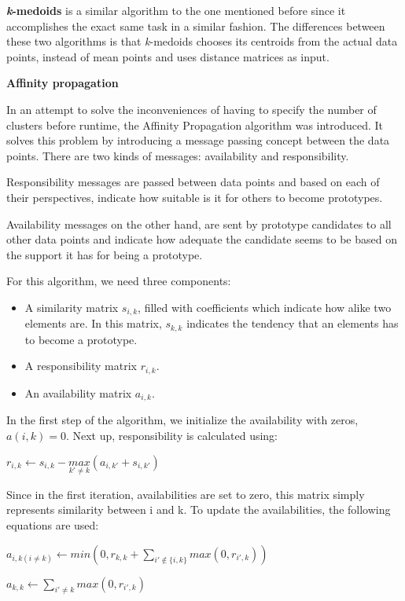 \textbf{\textit{k}-medoids} is a similar algorithm to the one mentioned before since it accomplishes the exact same task in a similar fashion. The differences between these two algorithms is that \textit{k}-medoids chooses its centroids from the actual data points, instead of mean points and uses distance matrices as input. 

\medskip
\textbf{Affinity propagation}

In an attempt to solve the inconveniences of having to specify the number of clusters before runtime, the Affinity Propagation \cite{frey2007clustering} algorithm was introduced. It solves this problem by introducing a message passing concept between the data points. There are two kinds of messages: availability and responsibility. 

Responsibility messages are passed between data points and based on each of their perspectives, indicate how suitable is it for others to become prototypes.  

Availability messages on the other hand, are sent by prototype candidates to all other data points and indicate how adequate the candidate seems to be based on the support it has for being a prototype.

For this algorithm, we need three components:
\begin{itemize}
	\item A similarity matrix $s_{i,k}$, filled with coefficients which indicate how alike two elements are. In this matrix,  $s_{k,k}$ indicates the tendency that an elements has to become a prototype. 
	\item A responsibility matrix $r_{i,k}$.
	\item An availability matrix $a_{i,k}$.
\end{itemize}  

In the first step of the algorithm, we initialize the availability with zeros, $a(i,k) = 0$. Next up, responsibility is calculated using:

\begin{center}
	$r_{i,k}\leftarrow s_{i,k} -\underset{k'\neq k}{max}(a_{i,k'} + s_{i,k'})$
\end{center}

Since in the first iteration, availabilities are set to zero, this matrix simply represents similarity between i and k. To update the availabilities, the following equations are used: 

\begin{center}
	$a_{i,k(i\neq k)}\leftarrow min\left ( 0, r_{k,k} + \sum\limits_{i'\notin \{ i,k \} }^{} max(0,r_{i',k})  \right)$	
	
	$a_{k,k} \leftarrow \sum\limits_{i'\neq k}^{ } max(0, r_{i',k})$
\end{center}

